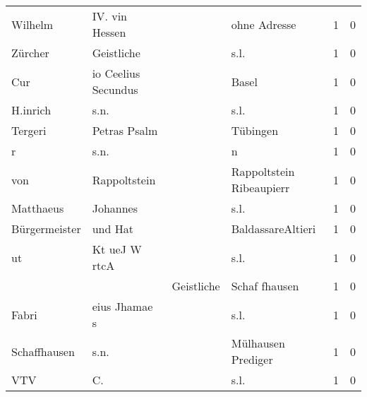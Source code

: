 \begin{center}
\begin{tiny}
\begin{longtabu}{llllrr}
                  Wilhelm &                     IV. vin Hessen &             &                                ohne Adresse &          1 &         0 \\
                  Zürcher &                         Geistliche &             &                                        s.l. &          1 &         0 \\
                      Cur &                io Ceelius Secundus &             &                                       Basel &          1 &         0 \\
                 H.inrich &                               s.n. &             &                                        s.l. &          1 &         0 \\
                  Tergeri &                       Petras Psalm &             &                                    Tübingen &          1 &         0 \\
                        r &                               s.n. &             &                                           n &          1 &         0 \\
                      von &                       Rappoltstein &             &                    Rappoltstein Ribeaupierr &          1 &         0 \\
                Matthaeus &                           Johannes &             &                                        s.l. &          1 &         0 \\
            Bürgermeister &                            und Hat &             &                           BaldassareAltieri &          1 &         0 \\
                       ut &                      Kt ueJ W rtcA &             &                                        s.l. &          1 &         0 \\
                          &                                    &  Geistliche &                               Schaf fhausen &          1 &         0 \\
                    Fabri &                      eius Jhamae s &             &                                        s.l. &          1 &         0 \\
             Schaffhausen &                               s.n. &             &                          Mülhausen Prediger &          1 &         0 \\
                      VTV &                                 C. &             &                                        s.l. &          1 &         0 \\

\end{longtabu}
\end{tiny}
\end{center}
